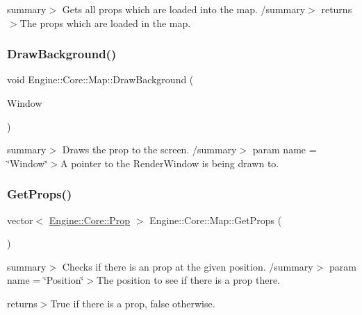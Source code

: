 summary$>$ Gets all props which are loaded into the map. /summary$>$ returns$>$The props which are loaded in the map.\mbox{\label{class_engine_1_1_core_1_1_map_aea4443f092aabf355e2427fa27605d4d}} 
\subsubsection{\texorpdfstring{Draw\+Background()}{DrawBackground()}}
{\footnotesize\ttfamily void Engine\+::\+Core\+::\+Map\+::\+Draw\+Background (\begin{DoxyParamCaption}\item[{Render\+Window $\ast$}]{Window }\end{DoxyParamCaption})}

summary$>$ Draws the prop to the screen. /summary$>$ param name = \char`\"{}\+Window\char`\"{}$>$A pointer to the Render\+Window is being drawn to.\mbox{\label{class_engine_1_1_core_1_1_map_a6e78069a9f1911a3ade60f38d4783563}} 
\subsubsection{\texorpdfstring{Get\+Props()}{GetProps()}}
{\footnotesize\ttfamily vector$<$ \hyperlink{namespace_engine_1_1_core_aa19279815c8e1c96d68332fcaa7d59d8}{Engine\+::\+Core\+::\+Prop} $>$ Engine\+::\+Core\+::\+Map\+::\+Get\+Props (\begin{DoxyParamCaption}\item[{void}]{ }\end{DoxyParamCaption})}

summary$>$ Checks if there is an prop at the given position. /summary$>$ param name = \char`\"{}\+Position\char`\"{}$>$The position to see if there is a prop there.

returns$>$True if there is a prop, false otherwise.\mbox{\label{class_engine_1_1_core_1_1_map_a5d17ba161757b4b971dba919e7e0b1c1}} 
